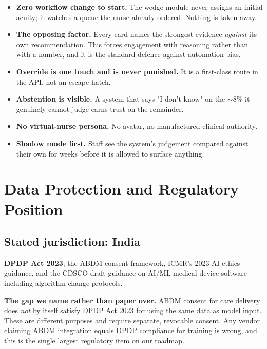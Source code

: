 \documentclass[10pt,a4paper,twocolumn]{article}
\begin{document}
\begin{itemize}
  \item \textbf{Zero workflow change to start.} The wedge module never assigns an initial acuity;
        it watches a queue the nurse already ordered. Nothing is taken away.
  \item \textbf{The opposing factor.} Every card names the strongest evidence \emph{against} its
        own recommendation. This forces engagement with reasoning rather than with a number, and it
        is the standard defence against automation bias.
  \item \textbf{Override is one touch and is never punished.} It is a first-class route in the API,
        not an escape hatch.
  \item \textbf{Abstention is visible.} A system that says "I don't know" on the $\sim$8\% it
        genuinely cannot judge earns trust on the remainder.
  \item \textbf{No virtual-nurse persona.} No avatar, no manufactured clinical authority.
  \item \textbf{Shadow mode first.} Staff see the system's judgement compared against their own for
        weeks before it is allowed to surface anything.
\end{itemize}

\section{Data Protection and Regulatory Position}
\label{sec:reg}

\subsection{Stated jurisdiction: India}
\textbf{DPDP Act 2023}, the ABDM consent framework, ICMR's 2023 AI ethics guidance, and the CDSCO
draft guidance on AI/ML medical device software including algorithm change protocols.

\begin{tcolorbox}[mpbox]
\textbf{The gap we name rather than paper over.} ABDM consent for care delivery does \emph{not} by
itself satisfy DPDP Act 2023 for using the same data as model input. These are different purposes
and require separate, revocable consent. Any vendor claiming ABDM integration equals DPDP
compliance for training is wrong, and this is the single largest regulatory item on our roadmap.
\end{tcolorbox}
\end{document}

